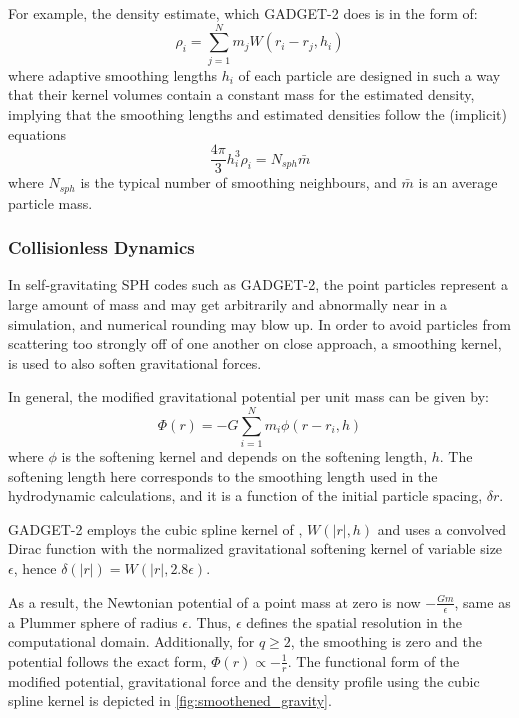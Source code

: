 For example, the density estimate,  which GADGET-2 does is in the form of:
\begin{equation}
    \rho_i = \sum_{j=1}^{N} m_j W(r_i -r_j,h_i)
\end{equation}
where adaptive smoothing lengths $h_i$ of each particle are designed in such a way that their kernel volumes contain a constant mass for the estimated density, implying that the smoothing lengths and estimated densities follow the (implicit) equations
\begin{equation}
    \frac{4\pi}{3} h_{i}^3 \rho_i = N_{sph} \bar{m}
\end{equation}
where $N_{sph}$ is the typical number of smoothing neighbours, and $\bar{m}$ is an average particle mass.

\subsubsection{Collisionless Dynamics}

In self-gravitating SPH codes such as GADGET-2, the point particles represent a large amount of mass and may get arbitrarily and abnormally near in a simulation, and numerical rounding may blow up. In order to avoid particles from scattering too strongly off of one another on close approach, a smoothing kernel, is used to also soften gravitational forces. 

In general, the modified gravitational potential per unit mass can be given by:
\begin{equation}\label{eq:softened_gravity}
   \Phi(r) = -G\sum_{i=1}^{N} m_i \phi(r-r_i,h)
\end{equation}
where $\phi$ is the softening kernel
and depends on the softening length, $h$. The softening length here corresponds to the smoothing length used in the hydrodynamic calculations, and it is a function of the initial particle spacing, $\delta r$.

GADGET-2 employs the cubic spline kernel of \cite{monaghan1985refined}, $W(|r|,h)$ and uses a convolved Dirac function  with the normalized gravitational softening kernel of variable size $\epsilon$, hence  $\delta(|r|) = W(|r|,2.8 \epsilon)$. 

As a result, the Newtonian potential of a point mass at zero is now $-\frac{Gm}{\epsilon}$, same as a Plummer sphere of radius $\epsilon$. Thus, $\epsilon$ defines the spatial resolution in the computational domain. Additionally, for $q \geq 2$, the smoothing is zero and the potential follows the exact form, $\Phi(r) \propto -\frac{1}{r}$. The functional form of the modified potential, gravitational force and the density profile using the cubic spline kernel is depicted in \cref{fig:smoothened_gravity}.

